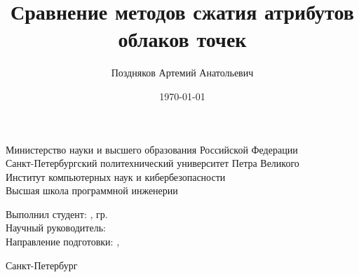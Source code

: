 \documentclass[aspectratio=169]{beamer}
\title{Сравнение методов сжатия атрибутов облаков точек}
\date{\today}
\author{Поздняков Артемий Анатольевич}
\institute{Высшая школа программной инженерии}
\begin{document}
  

  \begin{frame}

    \begin{center}
      \begin{scriptsize}
        Министерство науки и высшего образования Российской Федерации\\
        Санкт-Петербургский политехнический университет Петра Великого\\
        Институт компьютерных наук и кибербезопасности\\
        Высшая школа программной инженерии\\[5\baselineskip]
      \end{scriptsize}

      \Large\textbf{\Theme{}}
    \end{center}

    \begin{flushright}
      \begin{scriptsize}
        Выполнил студент: \textbf{\AuthorFull{}}, гр. \Group{}\\
        Научный руководитель: \SupervisorPosition{} \textbf{\SupervisorFull{}}\\
        Направление подготовки: \ProfileCode{}, \textbf{\ProfileName{}}\\
      \end{scriptsize}
    \end{flushright}

    \mbox{}\vfill

    \begin{center}
      \begin{scriptsize}
        Санкт-Петербург \\
        \the\year{}
      \end{scriptsize}
    \end{center}


  \end{frame}
\end{document}
